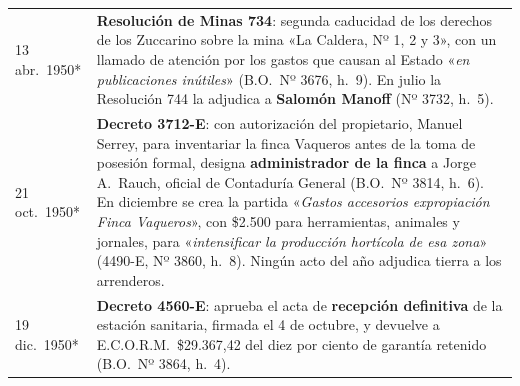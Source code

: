\begin{longtable}{@{}p{2.7cm}p{10.3cm}@{}}
13 abr.\ 1950* & \textbf{Resolución de Minas 734}: segunda caducidad de los derechos de los Zuccarino sobre la mina «La Caldera, Nº 1, 2 y 3», con un llamado de atención por los gastos que causan al Estado «\textit{en publicaciones inútiles}» (B.O.\ Nº 3676, h.\ 9). En julio la Resolución 744 la adjudica a \textbf{Salomón Manoff} (Nº 3732, h.\ 5). \\
21 oct.\ 1950* & \textbf{Decreto 3712-E}: con autorización del propietario, Manuel Serrey, para inventariar la finca Vaqueros antes de la toma de posesión formal, designa \textbf{administrador de la finca} a Jorge A.\ Rauch, oficial de Contaduría General (B.O.\ Nº 3814, h.\ 6). En diciembre se crea la partida «\textit{Gastos accesorios expropiación Finca Vaqueros}», con \$2.500 para herramientas, animales y jornales, para «\textit{intensificar la producción hortícola de esa zona}» (4490-E, Nº 3860, h.\ 8). Ningún acto del año adjudica tierra a los arrenderos. \\
19 dic.\ 1950* & \textbf{Decreto 4560-E}: aprueba el acta de \textbf{recepción definitiva} de la estación sanitaria, firmada el 4 de octubre, y devuelve a E.C.O.R.M.\ \$29.367,42 del diez por ciento de garantía retenido (B.O.\ Nº 3864, h.\ 4). \\

\end{longtable}

